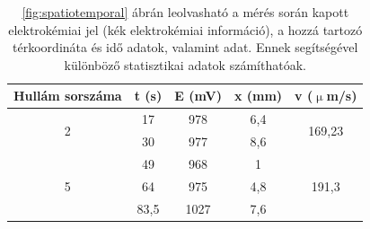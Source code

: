 \begin{table}[] 
\centering
\caption{\ref{fig:spatiotemporal} ábrán leolvasható a mérés során kapott elektrokémiai jel (kék elektrokémiai információ), a hozzá tartozó térkoordináta és idő adatok, valamint adat. Ennek segítségével különböző statisztikai adatok számíthatóak.}
\label{hullam}
\begin{tabular}{|c|c|c|c|c|}
\hline
\textbf{Hullám sorszáma} & \textbf{t (s)} & \textbf{E (mV)} & \textbf{x (mm)} & \textbf{v ($\upmu$m/s)}        \\ \hline
\multirow{2}{*}{2}       & 17             & 978             & 6,4             & \multirow{2}{*}{169,23} \\ \cline{2-4}
                         & 30             & 977             & 8,6             &                         \\ \hline
\multirow{3}{*}{5}       & 49             & 968             & 1               & \multirow{3}{*}{191,3}  \\ \cline{2-4}
                         & 64             & 975             & 4,8             &                         \\ \cline{2-4}
                         & 83,5           & 1027            & 7,6             &                         \\ \hline
\end{tabular}
\end{table}
